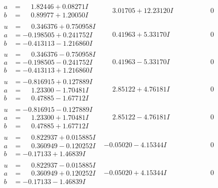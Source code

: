\documentclass[1p]{elsarticle_modified}
\theoremstyle{definition}
\begin{document}
$$\begin{array}{c|c|c}
\begin{aligned}
a &= \phantom{-}1.82446 + 0.08271 I \\
b &= \phantom{-}0.89977 + 1.20050 I\end{aligned}
 & \phantom{-}3.01705 + 12.23120 I & \phantom{-0.000000 } 0 \\ \hline\begin{aligned}
u &= \phantom{-}0.346376 + 0.750958 I \\
a &= -0.198505 + 0.241752 I \\
b &= -0.413113 - 1.216860 I\end{aligned}
 & \phantom{-}0.41963 + 5.33170 I & \phantom{-0.000000 } 0 \\ \hline\begin{aligned}
u &= \phantom{-}0.346376 - 0.750958 I \\
a &= -0.198505 - 0.241752 I \\
b &= -0.413113 + 1.216860 I\end{aligned}
 & \phantom{-}0.41963 - 5.33170 I & \phantom{-0.000000 } 0 \\ \hline\begin{aligned}
u &= -0.816915 + 0.127889 I \\
a &= \phantom{-}1.23300 - 1.70481 I \\
b &= \phantom{-}0.47885 - 1.67712 I\end{aligned}
 & \phantom{-}2.85122 + 4.76181 I & \phantom{-0.000000 } 0 \\ \hline\begin{aligned}
u &= -0.816915 - 0.127889 I \\
a &= \phantom{-}1.23300 + 1.70481 I \\
b &= \phantom{-}0.47885 + 1.67712 I\end{aligned}
 & \phantom{-}2.85122 - 4.76181 I & \phantom{-0.000000 } 0 \\ \hline\begin{aligned}
u &= \phantom{-}0.822937 + 0.015885 I \\
a &= \phantom{-}0.360949 - 0.120252 I \\
b &= -0.17133 + 1.46839 I\end{aligned}
 & -0.05020 - 4.15344 I & \phantom{-0.000000 } 0 \\ \hline\begin{aligned}
u &= \phantom{-}0.822937 - 0.015885 I \\
a &= \phantom{-}0.360949 + 0.120252 I \\
b &= -0.17133 - 1.46839 I\end{aligned}
 & -0.05020 + 4.15344 I & \phantom{-0.000000 } 0 \\ \hline\begin{aligned}

\end{aligned}
\end{array}$$
\end{document}
